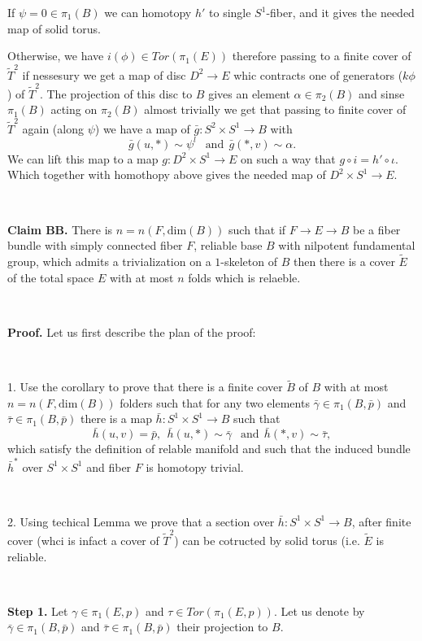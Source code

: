 \documentclass{article}
\begin{document}
If $\psi=0\in \pi_1(B)$ we can homotopy $h'$ to single $S^1$-fiber, and it gives the needed map of solid torus.

Otherwise, we have $i(\phi)\in Tor(\pi_1(E))$ 
therefore passing to a finite cover of $\tilde T^2$ 
if nessesury we get a map of
disc $D^2\to E$ whic contracts one of generators ($k \phi$) of $\tilde T^2$.
The projection of this disc to $B$ gives an element $\alpha\in \pi_2(B)$ 
and sinse $\pi_1(B)$ acting on $\pi_2(B)$ almost trivially we get 
that passing to finite cover of $\tilde T^2$ again (along $\psi$) we have a map of $\bar g:S^2\times S^1\to B$ with
$$ 
 \bar g(u,*)\sim\psi^l\ \ \text{ and}\ \ 
 \bar g(*,v)\sim\alpha.$$
We can lift this map to a map $g:D^2\times S^1\to E$ on such a way that $g\circ i=h'\circ \iota$. 
Which together with homothopy above gives the needed map of 
$D^2\times S^1\to E$.






\ 

{\bf Claim BB.} There is $n=n(F,\text{dim}(B))$ such that if $F\to E\to B$ 
be a fiber bundle with 
simply connected fiber $F$, reliable base $B$ with nilpotent fundamental group,
which admits a trivialization on a $1$-skeleton 
of $B$ then there is a cover $\tilde E$ of the  total space $E$ with at most $n$ folds which is relaeble.

\ 

{\bf Proof.} Let us first describe the plan of the proof:

\ 

1. Use the corollary to prove that there is a finite cover $\widetilde B$ of $B$ with at most $n=n(F,\text{dim}(B))$ folders such that for any two elements $\bar\gamma\in \pi_1(B,\bar p)$ and $\bar\tau\in \pi_1(B,\bar p)$ there is a map 
$\bar h:S^1\times S^1\to B$ such that 
$$\bar h(u,v)=\bar p,\ \ 
\bar h(u,*)\sim\bar\gamma\ \ \text{ and}\ \ 
\bar h(*,v)\sim\bar\tau,$$
which satisfy the definition of relable manifold and such that the induced bundle $\bar h^*$ over $S^1\times S^1$ and fiber $F$ is homotopy trivial.

\ 

2. Using techical Lemma we prove that a section over $\bar h:S^1\times S^1\to B$, after finite cover (whci is infact a cover of $\tilde T^2$) can be cotructed by solid torus (i.e. $\widetilde E$ is reliable.

\ 

{\bf Step 1.} Let $\gamma\in \pi_1(E,p)$ and $\tau\in Tor(\pi_1(E,p))$. 
Let us denote by $\bar\gamma\in \pi_1(B,\bar p)$ and 
$\bar\tau\in \pi_1(B,\bar p)$ their projection to $B$.
\end{document}
